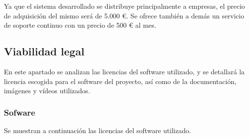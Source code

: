Ya que el sistema desarrollado se distribuye principalmente a empresas, el precio de adquisición del
mismo será de 5.000 €. Se ofrece también a demás un servicio de soporte continuo con un precio de 
500 € al mes.


\subsection{Viabilidad legal}

En este apartado se analizan las licencias del software utilizado, y se detallará la licencia 
escogida para el software del proyecto, así como de la documentación, imágenes y vídeos utilizados.

\subsubsection{Sofware}

Se muestran a continuación las licencias del software utilizado.

